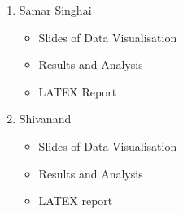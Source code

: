 \documentclass{article}
\begin{document}
\begin{enumerate}
\begin{itemize}
\end{itemize}
\item Samar Singhai 
\begin{itemize}
  \item Slides of Data Visualisation
  \item Results and Analysis
  \item LATEX Report
\end{itemize}
\item Shivanand
\begin{itemize}
  \item Slides of Data Visualisation
  \item Results and Analysis
  \item LATEX report
\end{itemize}
\end{enumerate}
\end{document}
